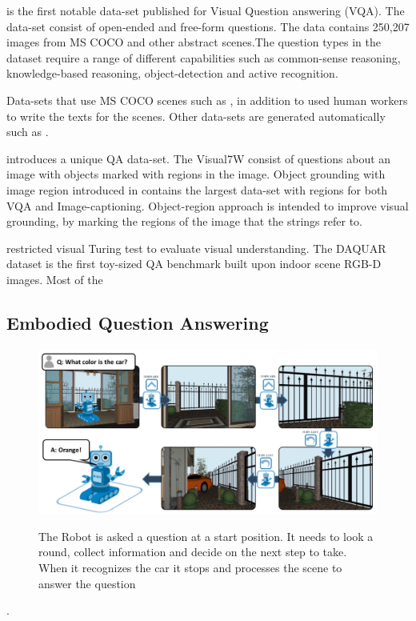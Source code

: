  \cite{VQA} is the first notable data-set published for Visual Question answering (VQA). The data-set consist of open-ended and free-form questions. The data contains 250,207 images from MS COCO \cite{lin2015microsoft} and other abstract scenes.The question types in the dataset require a range of different capabilities such as common-sense reasoning, knowledge-based reasoning, object-detection and active recognition.
 
 Data-sets that use MS COCO scenes such as \cite{gao2015talking}, \cite{yu2015visual} in addition to \cite{VQA} used human workers to write the texts for the scenes. Other data-sets are generated automatically such as \cite{ren2015exploring}. 


\cite{zhu2016visual7w} introduces a  unique QA data-set. The Visual7W consist of questions about an image with objects marked with regions in the image. Object grounding with image region introduced in \cite{krishna2016visual} contains the largest data-set with regions for both VQA and Image-captioning. Object-region approach is intended to improve visual grounding, by marking the regions of the image that the strings refer to.

restricted visual Turing test to evaluate visual understanding. The DAQUAR dataset is the first toy-sized QA benchmark built upon indoor scene RGB-D images. Most of the

\subsection{Embodied Question Answering}

\begin{figure}[H]
\includegraphics[scale=0.4]{images/EmbodiedQuestionAnswering.png}
\label{fig:EQA}
\caption{The Robot is asked a question at a start position. It needs to look a round, collect information and decide on the next step to take. When it recognizes the car it stops and processes the scene to answer the question }
\end{figure}. 

